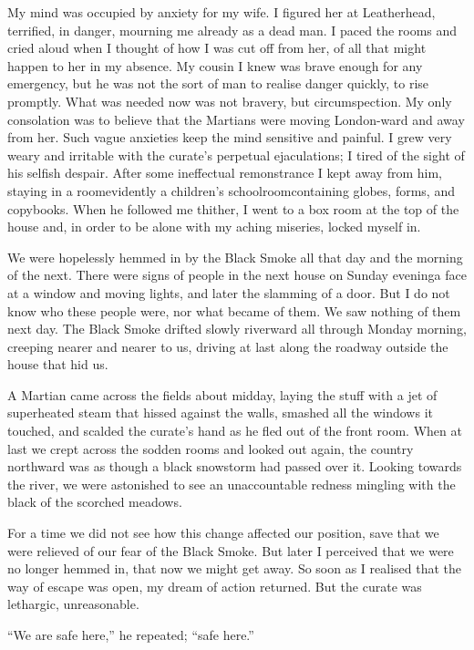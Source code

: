 My mind was occupied by anxiety for my wife. I figured her at
Leatherhead, terrified, in danger, mourning me already as a dead
man. I paced the rooms and cried aloud when I thought of how I was
cut off from her, of all that might happen to her in my absence. My
cousin I knew was brave enough for any emergency, but he was not
the sort of man to realise danger quickly, to rise promptly. What
was needed now was not bravery, but circumspection. My only
consolation was to believe that the Martians were moving
London-ward and away from her. Such vague anxieties keep the mind
sensitive and painful. I grew very weary and irritable with the
curate's perpetual ejaculations; I tired of the sight of his
selfish despair. After some ineffectual remonstrance I kept away
from him, staying in a room\dash{}evidently a children's
schoolroom\dash{}containing globes, forms, and copybooks. When he
followed me thither, I went to a box room at the top of the house
and, in order to be alone with my aching miseries, locked myself
in.

We were hopelessly hemmed in by the Black Smoke all that day and
the morning of the next. There were signs of people in the next
house on Sunday evening\dash{}a face at a window and moving lights, and
later the slamming of a door. But I do not know who these people
were, nor what became of them. We saw nothing of them next day. The
Black Smoke drifted slowly riverward all through Monday morning,
creeping nearer and nearer to us, driving at last along the roadway
outside the house that hid us.

A Martian came across the fields about midday, laying the stuff
with a jet of superheated steam that hissed against the walls,
smashed all the windows it touched, and scalded the curate's hand
as he fled out of the front room. When at last we crept across the
sodden rooms and looked out again, the country northward was as
though a black snowstorm had passed over it. Looking towards the
river, we were astonished to see an unaccountable redness mingling
with the black of the scorched meadows.

For a time we did not see how this change affected our position,
save that we were relieved of our fear of the Black Smoke. But
later I perceived that we were no longer hemmed in, that now we
might get away. So soon as I realised that the way of escape was
open, my dream of action returned. But the curate was lethargic,
unreasonable.

``We are safe here,'' he repeated; ``safe here.''


